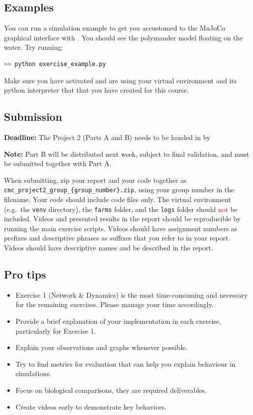 \documentclass{cmc}
\begin{document}
\subsection*{Examples}

You can run a simulation example to get you accustomed
to the MuJoCo graphical interface with . You
should see the polymander model floating on the water. Try running:
\label{sec:mujoco-example}
\begin{lstlisting}[language=Bash]
  >> python exercise_example.py
\end{lstlisting}

 Make sure you have activated and are using your
virtual environment and its python interpreter that that you have created for
this course.

\subsection{Submission}
\textbf{Deadline:} The Project 2 (Parts A and B) needs to be handed in by 

\textbf{Note:} Part B will be distributed next week, subject to final validation, and must be submitted together with Part A.

When submitting, zip your report and your code together as
\nolinkurl{cmc_project2_group_{group_number}.zip}, using your group
number in the filename. Your code should include code files only. The
virtual environment (e.g.\ the \texttt{venv} directory), the
\texttt{farms} folder, and the \texttt{logs} folder should
\textcolor{red}{not} be included. Videos and presented results in the
report should be reproducible by running the main exercise scripts.
Videos should have assignment numbers as prefixes and descriptive
phrases as suffixes that you refer to in your report.
Videos should have descriptive names and be described in the report.


\subsection*{Pro tips}

\begin{itemize}
\item Exercise 1 (Network \& Dynamics) is the most time-consuming and necessary for the remaining exercises. Please manage your time accordingly.
\item Provide a brief explanation of your implementation in each exercise, particularly for Exercise 1.
\item Explain your observations and graphs whenever possible.
\item Try to find metrics for evaluation that can help you explain behaviour in simulations.
\item Focus on biological comparisons, they are required deliverables.
\item Create videos early to demonstrate key behaviors.
\end{itemize}
\end{document}
